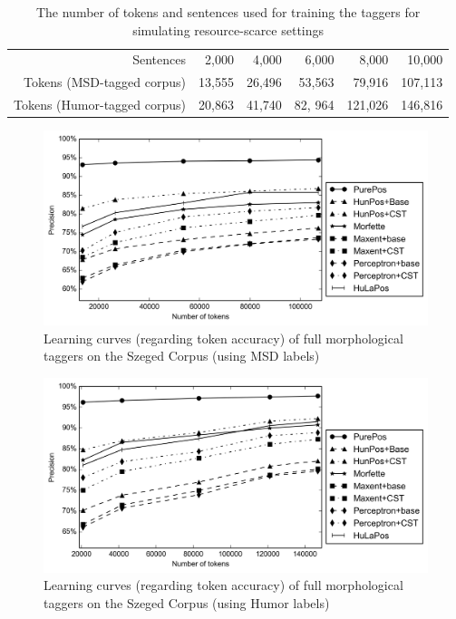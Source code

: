 \begin{table}[H]
\centering
\caption{The number of tokens and sentences used for training the taggers for simulating resource-scarce settings}
\label{tab:small-szeged}
\begin{tabular}{ r | r r r r r}
Sentences & 2,000 & 4,000 & 6,000 & 8,000 & 10,000 \\
Tokens (MSD-tagged corpus) & 13,555 & 26,496 & 53,563 & 79,916 & 107,113 \\
Tokens (Humor-tagged corpus) & 20,863 & 41,740 & 82, 964 & 121,026 & 146,816 \\
\end{tabular}
\end{table}


\begin{figure}[H]
  \centering
  \includegraphics[width=1\textwidth]{MorphTagging/msd_token.png} 
  \caption{Learning curves (regarding token accuracy) of full morphological taggers on the Szeged Corpus (using MSD labels)}
  \label{fig:msd-token}
\end{figure}

\begin{figure}[H]
  \centering
  \includegraphics[width=1\textwidth]{MorphTagging/humor_token.png}
  \caption{Learning curves (regarding token accuracy) of full morphological taggers on the Szeged Corpus (using Humor labels)}
  \label{fig:humor-token}
\end{figure}

